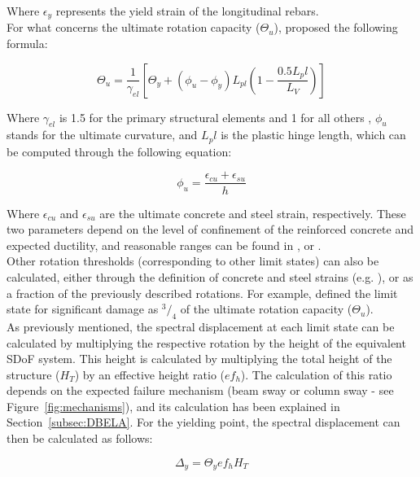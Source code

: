 Where $\epsilon_y$ represents the yield strain of the longitudinal rebars.\\

For what concerns the ultimate rotation capacity ($\Theta_u$), \cite{PanagiotakosFardis2001} proposed the following formula:

\begin{equation}
	\Theta_u = \frac{1}{\gamma_{el}}\left[\Theta_y + (\phi_u-\phi_y)L_{pl}\left(1-\frac{0.5L_pl}{L_V}\right)\right]
\end{equation}

Where $\gamma_{el}$ is 1.5 for the primary structural elements and 1 for all others \citep{BorziEtAl2008b}, $\phi_u$ stands for the ultimate curvature, and $L_pl$ is the plastic hinge length, which can be computed through the following equation:

\begin{equation}
	\phi_u = \frac{\epsilon_{cu}+\epsilon_{su}}{h}
\end{equation}

Where $\epsilon_{cu}$ and $\epsilon_{su}$ are the ultimate concrete and steel strain, respectively. These two parameters depend on the level of confinement of the reinforced concrete and expected ductility, and reasonable ranges can be found in \cite{Calvi1999}, \cite{CrowleyEtAl2004} or \cite{BalEtAl2010}.\\

Other rotation thresholds (corresponding to other limit states) can also be calculated, either through the definition of concrete and steel strains (e.g. \cite{CrowleyEtAl2004}), or as a fraction of the previously described rotations. For example, \cite{BorziEtAl2008b} defined the limit state for significant damage as $^3/_4$ of the ultimate rotation capacity ($\Theta_u$).\\

As previously mentioned, the spectral displacement at each limit state can be calculated by multiplying the respective rotation by the height of the equivalent SDoF system. This height is calculated by multiplying the total height of the structure ($H_T$) by an effective height ratio ($ef_h$). The calculation of this ratio depends on the expected failure mechanism (beam sway or column sway - see Figure~\ref{fig:mechanisms}), and its calculation has been explained in Section~\ref{subsec:DBELA}. For the yielding point, the spectral displacement can then be calculated as follows:

\begin{equation}
	\Delta_y = \Theta_yef_hH_T
\end{equation}

